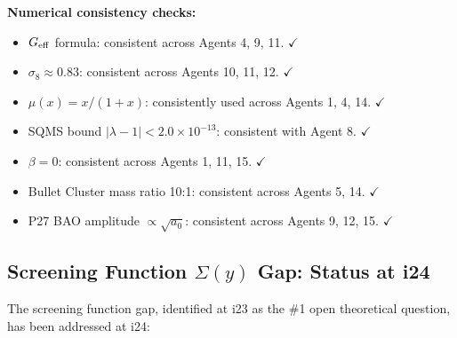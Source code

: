 \documentclass[11pt]{article}
\newcommand{\ee}[1]{\times 10^{#1}}
\newcommand{\Geff}{G_{\rm eff}}
\newcommand{\aM}{a_0}
\begin{document}
\begin{tcolorbox}[colback=red!5!white, colframe=red!70!black,
  title=\textbf{CROSS-CHECK RESULTS}]
\textbf{Numerical consistency checks:}
\begin{itemize}
  \item $\Geff$ formula: consistent across Agents 4, 9, 11. $\checkmark$
  \item $\sigma_8 \approx 0.83$: consistent across Agents 10, 11, 12. $\checkmark$
  \item $\mu(x) = x/(1+x)$: consistently used across Agents 1, 4, 14. $\checkmark$
  \item SQMS bound $|\lambda-1| < 2.0\ee{-13}$: consistent with Agent 8. $\checkmark$
  \item $\beta = 0$: consistent across Agents 1, 11, 15. $\checkmark$
  \item Bullet Cluster mass ratio 10:1: consistent across Agents 5, 14. $\checkmark$
  \item P27 BAO amplitude $\propto \sqrt{\aM}$: consistent across Agents 9, 12, 15. $\checkmark$
\end{itemize}

\end{tcolorbox}

\subsection{Screening Function $\Sigma(y)$ Gap: Status at i24}

The screening function gap, identified at i23 as the \#1 open theoretical
question, has been addressed at i24:
\end{document}
